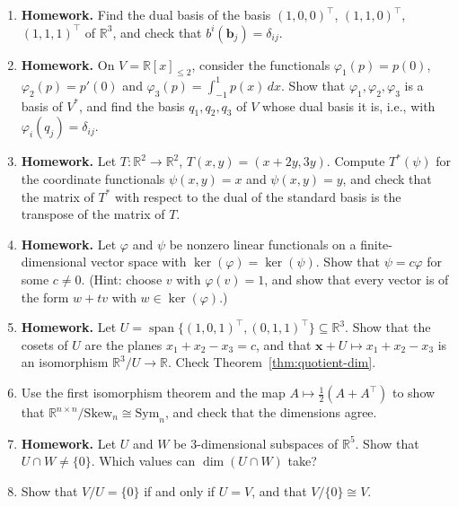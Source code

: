 \documentclass[11pt]{article}
\newcommand{\homework}{\textcolor{red!70!black}{\textbf{Homework.}}}
\theoremstyle{definition}
\theoremstyle{plain}
\theoremstyle{remark}
\DeclareMathOperator{\Span}{span}
\begin{document}
\begin{enumerate}[leftmargin=*]
\begin{enumerate}
		\item Find the eigenvalues of the difference filter, $(\mathbf{c} \ast \mathbf{x})_j = x_j - x_{j-1}$. Which signals does it map to $\mathbf{0}$?
		\item Show that $\mathrm{circ}(\mathbf{c})$ is invertible if and only if $\hat{c}_m \neq 0$ for all $m$, and that its inverse is again circulant.
	\end{enumerate}
	\item \homework{} Find the dual basis of the basis $(1, 0, 0)^\top$, $(1, 1, 0)^\top$, $(1, 1, 1)^\top$ of $\mathbb{R}^3$, and check that $b^i(\mathbf{b}_j) = \delta_{ij}$.
	\item \homework{} On $V = \mathbb{R}[x]_{\leq 2}$, consider the functionals $\varphi_1(p) = p(0)$, $\varphi_2(p) = p'(0)$ and $\varphi_3(p) = \int_{-1}^1 p(x)\, dx$. Show that $\varphi_1, \varphi_2, \varphi_3$ is a basis of $V^*$, and find the basis $q_1, q_2, q_3$ of $V$ whose dual basis it is, i.e., with $\varphi_i(q_j) = \delta_{ij}$.
	\item \homework{} Let $T: \mathbb{R}^2 \to \mathbb{R}^2$, $T(x, y) = (x + 2y, 3y)$. Compute $T^*(\psi)$ for the coordinate functionals $\psi(x, y) = x$ and $\psi(x, y) = y$, and check that the matrix of $T^*$ with respect to the dual of the standard basis is the transpose of the matrix of $T$.
	\item \homework{} Let $\varphi$ and $\psi$ be nonzero linear functionals on a finite-dimensional vector space with $\ker(\varphi) = \ker(\psi)$. Show that $\psi = c\varphi$ for some $c \neq 0$. (Hint: choose $v$ with $\varphi(v) = 1$, and show that every vector is of the form $w + tv$ with $w \in \ker(\varphi)$.)
	\item \homework{} Let $U = \Span\{(1, 0, 1)^\top, (0, 1, 1)^\top\} \subseteq \mathbb{R}^3$. Show that the cosets of $U$ are the planes $x_1 + x_2 - x_3 = c$, and that $\mathbf{x} + U \mapsto x_1 + x_2 - x_3$ is an isomorphism $\mathbb{R}^3/U \to \mathbb{R}$. Check Theorem~\ref{thm:quotient-dim}.
	\item Use the first isomorphism theorem and the map $A \mapsto \frac{1}{2}(A + A^\top)$ to show that $\mathbb{R}^{n \times n}/\mathrm{Skew}_n \cong \mathrm{Sym}_n$, and check that the dimensions agree.
	\item \homework{} Let $U$ and $W$ be $3$-dimensional subspaces of $\mathbb{R}^5$. Show that $U \cap W \neq \{0\}$. Which values can $\dim(U \cap W)$ take?
	\item Show that $V/U = \{0\}$ if and only if $U = V$, and that $V/\{0\} \cong V$.

\end{enumerate}
\end{document}

